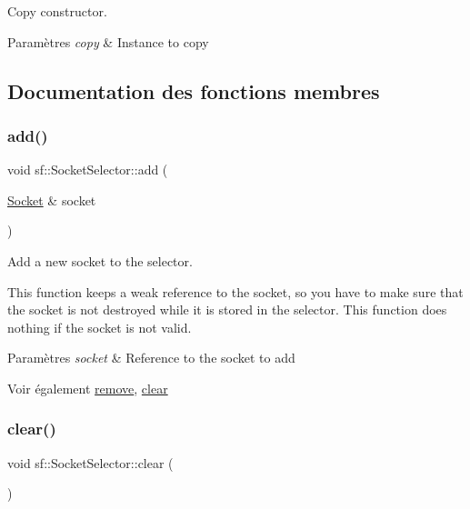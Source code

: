 Copy constructor. 


\begin{DoxyParams}{Paramètres}
{\em copy} & Instance to copy \\
\hline
\end{DoxyParams}


\subsection{Documentation des fonctions membres}
\mbox{\label{classsf_1_1SocketSelector_ade952013232802ff7b9b33668f8d2096}} 
\subsubsection{\texorpdfstring{add()}{add()}}
{\footnotesize\ttfamily void sf\+::\+Socket\+Selector\+::add (\begin{DoxyParamCaption}\item[{\hyperlink{classsf_1_1Socket}{Socket} \&}]{socket }\end{DoxyParamCaption})}



Add a new socket to the selector. 

This function keeps a weak reference to the socket, so you have to make sure that the socket is not destroyed while it is stored in the selector. This function does nothing if the socket is not valid.


\begin{DoxyParams}{Paramètres}
{\em socket} & Reference to the socket to add\\
\hline
\end{DoxyParams}
\begin{DoxySeeAlso}{Voir également}
\hyperlink{classsf_1_1SocketSelector_a98b6ab693a65b82caa375639232357c1}{remove}, \hyperlink{classsf_1_1SocketSelector_a76e650acb0199d4be91e90a493fbc91a}{clear} 
\end{DoxySeeAlso}
\mbox{\label{classsf_1_1SocketSelector_a76e650acb0199d4be91e90a493fbc91a}} 
\subsubsection{\texorpdfstring{clear()}{clear()}}
{\footnotesize\ttfamily void sf\+::\+Socket\+Selector\+::clear (\begin{DoxyParamCaption}{ }\end{DoxyParamCaption})}




